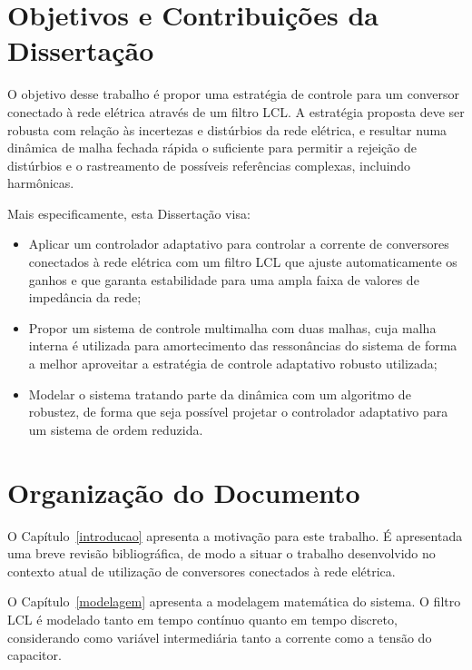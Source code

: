 \section{Objetivos e Contribuições da Dissertação}

	O objetivo desse trabalho é propor uma estratégia de controle para um conversor conectado à rede elétrica através de um filtro LCL. A estratégia proposta deve ser robusta com relação às incertezas e distúrbios da rede elétrica, e resultar numa dinâmica de malha fechada rápida o suficiente para permitir a rejeição de distúrbios e o rastreamento de possíveis referências complexas, incluindo harmônicas.

	Mais especificamente, esta Dissertação visa:

	\begin{itemize}
		\item Aplicar um controlador adaptativo para controlar a corrente de conversores conectados à rede elétrica com um filtro LCL que ajuste automaticamente os ganhos e que garanta estabilidade para uma ampla faixa de valores de impedância da rede;
    \item Propor um sistema de controle multimalha com duas malhas, cuja malha interna é utilizada para amortecimento das ressonâncias do sistema de forma a melhor aproveitar a estratégia de controle adaptativo robusto utilizada;
    \item Modelar o sistema tratando parte da dinâmica com um algoritmo de robustez, de forma que seja possível projetar o controlador adaptativo para um sistema de ordem reduzida.
	\end{itemize}


\section{Organização do Documento}

	O Capítulo~\ref{introducao} apresenta a motivação para este trabalho. É apresentada uma breve revisão bibliográfica, de modo a situar o trabalho desenvolvido no contexto atual de utilização de conversores conectados à rede elétrica.

	O Capítulo~\ref{modelagem} apresenta a modelagem matemática do sistema. O filtro LCL é modelado tanto em tempo contínuo quanto em tempo discreto, considerando como variável intermediária tanto a corrente como a tensão do capacitor.

